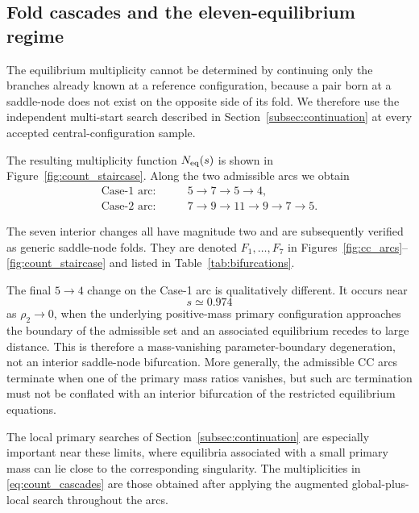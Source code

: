 \subsection{Fold cascades and the eleven-equilibrium regime}
\label{subsec:cascades}

The equilibrium multiplicity cannot be determined by continuing only the
branches already known at a reference configuration, because a pair born
at a saddle-node does not exist on the opposite side of its fold. We
therefore use the independent multi-start search described in
Section~\ref{subsec:continuation} at every accepted central-configuration sample.

The resulting multiplicity function $N_{\rm eq}(s)$ is shown in
Figure~\ref{fig:count_staircase}. Along the two admissible arcs we obtain
\begin{equation}
\begin{aligned}
\text{Case-1 arc:}&\qquad
5\rightarrow7\rightarrow5\rightarrow4,
\\
\text{Case-2 arc:}&\qquad
7\rightarrow9\rightarrow11\rightarrow9\rightarrow7\rightarrow5.
\end{aligned}
\label{eq:count_cascades}
\end{equation}

The seven interior changes all have magnitude two and are subsequently
verified as generic saddle-node folds. They are denoted
$F_1,\ldots,F_7$ in Figures~\ref{fig:cc_arcs}--\ref{fig:count_staircase}
and listed in Table~\ref{tab:bifurcations}.

The final $5\rightarrow4$ change on the Case-1 arc is qualitatively
different. It occurs near
\[
s\simeq0.974
\]
as $\rho_2\rightarrow0$, when the underlying positive-mass primary
configuration approaches the boundary of the admissible set and an
associated equilibrium recedes to large distance. This is therefore a
mass-vanishing parameter-boundary degeneration, not an interior
saddle-node bifurcation. More generally, the admissible CC arcs terminate
when one of the primary mass ratios vanishes, but such arc termination must
not be conflated with an interior bifurcation of the restricted equilibrium
equations.

The local primary searches of Section~\ref{subsec:continuation} are especially important near
these limits, where equilibria associated with a small primary mass can lie
close to the corresponding singularity. The multiplicities in
\eqref{eq:count_cascades} are those obtained after applying the augmented
global-plus-local search throughout the arcs.

